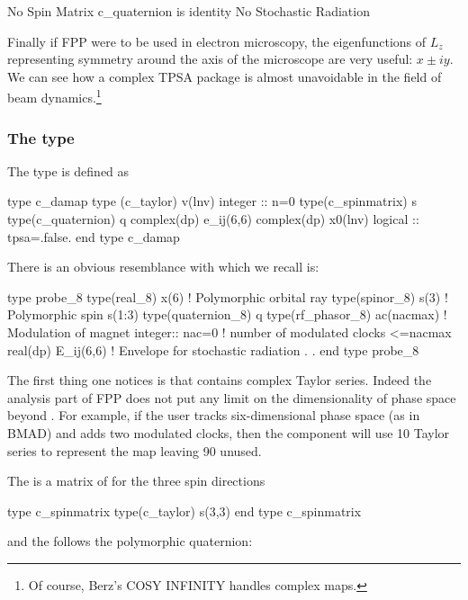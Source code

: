 \documentclass[english,12pt,article]{article} %
\begin{document}
{\begin{example}
  No Spin Matrix
  c_quaternion is identity
 No Stochastic Radiation
\end{example}

Finally if FPP were to be used in electron microscopy, the eigenfunctions of $L_z$ representing symmetry around the axis of the microscope are very useful: $x \pm i y$. We can see how a complex TPSA package is almost unavoidable in the field of beam dynamics.\footnote{Of course, Berz's COSY INFINITY handles complex maps.}
 
\subsubsection{The type {} }\label{sec:c_damap}
  
  The type   is defined as
  \begin{example}
 type c_damap
   type (c_taylor) v(lnv)  
   integer :: n=0 
   type(c_spinmatrix) s 
   type(c_quaternion) q
   complex(dp) e_ij(6,6) 
   complex(dp) x0(lnv) 
   logical :: tpsa=.false.
 end type c_damap
  \end{example}


 
There is an obvious resemblance  with  which we recall is:
  \begin{example}
    type probe_8
     type(real_8) x(6)     ! Polymorphic orbital ray
     type(spinor_8) s(3)   ! Polymorphic spin s(1:3)
     type(quaternion_8) q 
     type(rf_phasor_8)  ac(nacmax)  ! Modulation of magnet
     integer:: nac=0 !  number of modulated clocks <=nacmax
     real(dp) E_ij(6,6)   !  Envelope for stochastic radiation
           .
           .
  end type probe_8
    \end{example}

The first thing one notices is that   contains  complex Taylor series. Indeed the analysis part of FPP does not put any limit on the dimensionality of phase space beyond . For example, if the user tracks six-dimensional phase space (as in BMAD) and adds two modulated clocks, then the component    will use 10 Taylor series to represent the map leaving 90 unused. 


The  is a matrix of   for the three spin directions
  \begin{example}
  type c_spinmatrix
     type(c_taylor) s(3,3)
  end type c_spinmatrix
      \end{example}
and the  follows the polymorphic quaternion:

}
\end{document}
